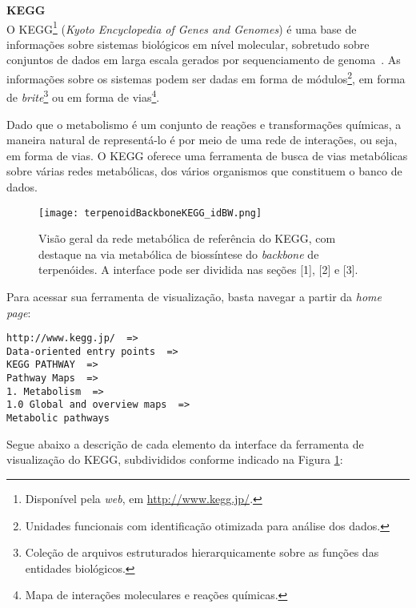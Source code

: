 \textbf{KEGG} \\

\indent O KEGG\footnote{Disponível pela \textit{web}, em \url{http://www.kegg.jp/}.} (\textit{Kyoto Encyclopedia of Genes and Genomes}) é uma base de informações sobre sistemas biológicos em nível molecular, sobretudo sobre conjuntos de dados em larga escala gerados por sequenciamento de genoma~\cite{keggOverview}. As informações sobre os sistemas podem ser dadas em forma de módulos\footnote{Unidades funcionais com identificação otimizada para análise dos dados.}, em forma de \textit{brite}\footnote{Coleção de arquivos estruturados hierarquicamente sobre as funções das entidades biológicos.} ou em forma de vias\footnote{Mapa de interações moleculares e reações químicas.}.

\indent Dado que o metabolismo é um conjunto de reações e transformações químicas, a maneira natural de representá-lo é por meio de uma rede de interações, ou seja, em forma de vias. O KEGG oferece uma ferramenta de busca de vias metabólicas sobre várias redes metabólicas, dos vários organismos que constituem o banco de dados.

\begin{figure}[!h]
\centering
\texttt{[image: terpenoidBackboneKEGG\_idBW.png]}
\caption{Visão geral da rede metabólica de referência do KEGG, com destaque na via metabólica de biossíntese do \textit{backbone} de terpenóides. A interface pode ser dividida nas seções [1], [2] e [3].}
\label{terpenoidBackboneKEGG_id}
\end{figure}

\indent Para acessar sua ferramenta de visualização, basta navegar a partir da \textit{home page}: \\

\begin{lstlisting}[frame=single] 
http://www.kegg.jp/  =>
Data-oriented entry points  =>
KEGG PATHWAY  =>
Pathway Maps  =>
1. Metabolism  =>
1.0 Global and overview maps  =>
Metabolic pathways
\end{lstlisting}

\indent Segue abaixo a descrição de cada elemento da interface da ferramenta de visualização do KEGG, subdivididos conforme indicado na Figura \ref{terpenoidBackboneKEGG_id}:

